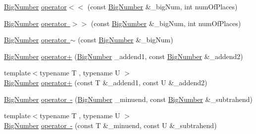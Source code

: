\begin{DoxyCompactItemize}
\item 
\mbox{\hyperlink{class_big_nums_1_1_big_number}{Big\+Number}} \mbox{\hyperlink{class_big_nums_1_1_big_number_ab6d6f57915676119fc27d509ffbc7aaa}{operator$<$$<$}} (const \mbox{\hyperlink{class_big_nums_1_1_big_number}{Big\+Number}} \&\+\_\+big\+Num, int num\+Of\+Places)
\item 
\mbox{\hyperlink{class_big_nums_1_1_big_number}{Big\+Number}} \mbox{\hyperlink{class_big_nums_1_1_big_number_a79a63ab9c19b4fc86b225bbaba7435f3}{operator $>$$>$}} (const \mbox{\hyperlink{class_big_nums_1_1_big_number}{Big\+Number}} \&\+\_\+big\+Num, int num\+Of\+Places)
\item 
\mbox{\hyperlink{class_big_nums_1_1_big_number}{Big\+Number}} \mbox{\hyperlink{class_big_nums_1_1_big_number_a09ab9caa6f21204eed61e6e96e9e72cc}{operator $\sim$}} (const \mbox{\hyperlink{class_big_nums_1_1_big_number}{Big\+Number}} \&\+\_\+big\+Num)
\end{DoxyCompactItemize}
\textbf{ }\par
\begin{DoxyCompactItemize}
\item 
\mbox{\hyperlink{class_big_nums_1_1_big_number}{Big\+Number}} \mbox{\hyperlink{class_big_nums_1_1_big_number_a3d910bc1823b1290f26b1764a93e77ea}{operator+}} (\mbox{\hyperlink{class_big_nums_1_1_big_number}{Big\+Number}} \+\_\+addend1, const \mbox{\hyperlink{class_big_nums_1_1_big_number}{Big\+Number}} \&\+\_\+addend2)
\item 
{\footnotesize template$<$typename T , typename U $>$ }\\\mbox{\hyperlink{class_big_nums_1_1_big_number}{Big\+Number}} \mbox{\hyperlink{class_big_nums_1_1_big_number_ab90a430bf6202a4f133fc915101cd929}{operator+}} (const T \&\+\_\+addend1, const U \&\+\_\+addend2)
\end{DoxyCompactItemize}

\textbf{ }\par
\begin{DoxyCompactItemize}
\item 
\mbox{\hyperlink{class_big_nums_1_1_big_number}{Big\+Number}} \mbox{\hyperlink{class_big_nums_1_1_big_number_a9a4cb9889d9180fb6bc9bfdb1de1e8b9}{operator -\/}} (\mbox{\hyperlink{class_big_nums_1_1_big_number}{Big\+Number}} \+\_\+minuend, const \mbox{\hyperlink{class_big_nums_1_1_big_number}{Big\+Number}} \&\+\_\+subtrahend)
\item 
{\footnotesize template$<$typename T , typename U $>$ }\\\mbox{\hyperlink{class_big_nums_1_1_big_number}{Big\+Number}} \mbox{\hyperlink{class_big_nums_1_1_big_number_abafc9bc65d3cf2b1a87fe226d37b107c}{operator -\/}} (const T \&\+\_\+minuend, const U \&\+\_\+subtrahend)
\end{DoxyCompactItemize}

